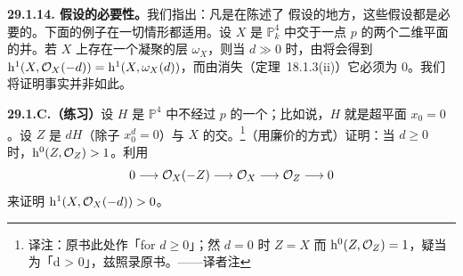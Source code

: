 \textbf{29.1.14. \trCM{}假设的必要性。}\quad 我们指出：凡是在陈述了 \trCM{}假设的地方，这些假设都是必要的。下面的例子在一切情形都适用。设 $X$ 是 $\mathbb{P}^4_k$ 中交于一点 $p$ 的两个二维平面的并。若 $X$ 上存在一个凝聚的\trCanonical{}层 $\omega_X$，则当 $d\gg 0$ 时，由\trSerreDuality{}将会得到 $\mathrm{h}^1(X,\mathcal{O}_X(-d))=\mathrm{h}^1(X,\omega_X(d))$，而由\trSerre{}消失（\mbox{定理~18.1.3}(ii)）它必须为 $0$。我们将证明事实并非如此。

\textbf{29.1.C.（练习）}\quad 设 $H$ 是 $\mathbb{P}^4$ 中不经过 $p$ 的一个\trHyperplane；比如说，$H$ 就是超平面 $x_0=0$。设 $Z$ 是 $dH$（除子 $x_0^d=0$）与 $X$ 的交。\footnote{译注：原书此处作「for \(d\ge 0\)」；然 $d=0$ 时 $Z=X$ 而 $\mathrm{h}^0(Z,\mathcal{O}_Z)=1$，疑当为「d > 0」，兹照录原书。——译者注}（用廉价的方式）证明：当 $d\ge 0$ 时，$\mathrm{h}^0(Z,\mathcal{O}_Z)>1$。利用\trExactSequence
\[
0\longrightarrow\mathcal{O}_X(-Z)\longrightarrow\mathcal{O}_X\longrightarrow\mathcal{O}_Z\longrightarrow 0
\]
来证明 $\mathrm{h}^1(X,\mathcal{O}_X(-d))>0$。

